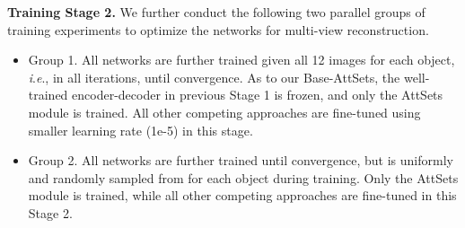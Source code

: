 \documentclass[twocolumn]{svjour3}    \pdfoutput=1
\newcommand{\nickname}{AttSets}
\newcommand{\ie}{\textit{i}.\textit{e}., }
\begin{document}
\textbf{Training Stage 2.} We further conduct the following two parallel groups of training experiments to optimize the networks for multi-view reconstruction.
\begin{itemize}[leftmargin=0.3cm]
\item Group 1. All networks are further trained given all 12 images for each object, \ie  in all iterations, until convergence. As to our Base-AttSets, the well-trained encoder-decoder in previous Stage 1 is frozen, and only the \nickname{} module is trained. All other competing approaches are fine-tuned using smaller learning rate (1e-5) in this stage.

\item Group 2. All networks are further trained until convergence, but  is uniformly and randomly sampled from  for each object during training. Only the \nickname{} module is trained, while all other competing approaches are fine-tuned in this Stage 2.
\end{itemize}
\end{document}
